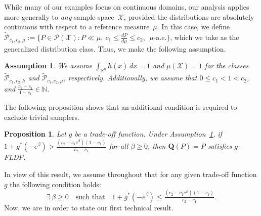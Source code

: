 \documentclass[accepted]{article}
\theoremstyle{plain} %
\newtheorem{proposition}[theorem]{Proposition}
\newtheorem{assumption}[theorem]{Assumption}
\theoremstyle{definition}
\theoremstyle{remark}
\newcommand{\SA}[1]{\textbf{\textcolor{Magenta}{[#1]}}}
\newcommand{\HG}[1]{\textcolor{cyan}{[#1]}}
\begin{document}
While many of our examples focus on continuous domains, our analysis applies more generally to \emph{any} sample space~\( \mathcal{X} \), provided the distributions are absolutely continuous with respect to a reference measure~\( \mu \). In this case, we define  $
\tilde{\mathcal{P}}_{c_1, c_2, \mu}
:= \{P\in \mathcal{P}(\mathcal{X}):P \ll \mu, ~c_1 \leq \frac{dP}{d\mu} \leq c_2, ~~ \mu\text{-a.e.}\}$, which we take as the generalized distribution class.
Thus, we make the following assumption. 
\begin{assumption}\label{assumption: norm}
We assume $\int_{\mathbb{R}^n} h(x)\,dx = 1$ and $\mu(\mathcal{X}) = 1$ for the classes $\tilde{\mathcal{P}}_{c_1, c_2, h}$ and $\tilde{\mathcal{P}}_{c_1, c_2, \mu}$, respectively. Additionally, we assume that $0 \leq c_1 < 1 < c_2$, and $\frac{c_2 - c_1}{1 - c_1} \in \mathbb{N}$. 
\end{assumption}
The following proposition shows that an additional condition is required to exclude trivial samplers.
\begin{proposition}\label{prop: triviality functional}
Let $g$ be a trade-off function. Under Assumption~\ref{assumption: norm},  if \( 1 + g^*(-e^\beta) > \frac{(c_2 - c_1 e^\beta)(1 - c_1)}{c_2 - c_1} \) for all \( \beta \geq 0 \), then \( \mathbf{Q}(P) = P \) satisfies \( g \)-FLDP. 
\end{proposition}
In view of this result, we assume throughout that for any given trade-off function $g$ the following condition holds:  \begin{equation}\label{eqn: non-trivial condition condition functional}
    \exists\, \beta \geq 0 \quad \text{such that} \quad 1 + g^*(-e^\beta) \leq \tfrac{(c_2 - c_1 e^\beta)(1 - c_1)}{c_2 - c_1}.
\end{equation}
Now, we are in order to state our first technical result. 
\end{document}

